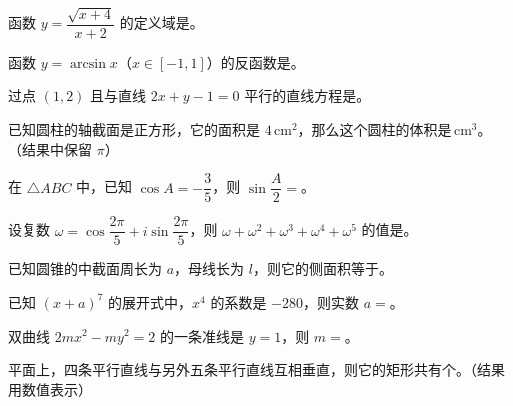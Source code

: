 \begin{question}
函数 $y=\dfrac{\sqrt{x+4}}{x+2}$ 的定义域是\gkblank{}。

\end{question}
\begin{question}
函数 $y=\arcsin x$（$x\in[-1,1]$）的反函数是\gkblank{}。

\end{question}
\begin{question}
过点 $(1,2)$ 且与直线 $2x+y-1=0$ 平行的直线方程是\gkblank{}。

\end{question}
\begin{question}
已知圆柱的轴截面是正方形，它的面积是 $4\,\mathrm{cm}^2$，那么这个圆柱的体积是\gkblank{}$\,\mathrm{cm}^3$。（结果中保留 $\pi$）

\end{question}
\begin{question}
在 $\triangle ABC$ 中，已知 $\cos A=-\dfrac35$，则 $\sin\dfrac A2=$\gkblank{}。

\end{question}
\begin{question}
设复数 $\omega=\cos\dfrac{2\pi}{5}+i\sin\dfrac{2\pi}{5}$，则 $\omega+\omega^2+\omega^3+\omega^4+\omega^5$ 的值是\gkblank{}。

\end{question}
\begin{question}
已知圆锥的中截面周长为 $a$，母线长为 $l$，则它的侧面积等于\gkblank{}。

\end{question}
\begin{question}
已知 $(x+a)^7$ 的展开式中，$x^4$ 的系数是 $-280$，则实数 $a=$\gkblank{}。

\end{question}
\begin{question}
双曲线 $2mx^2-my^2=2$ 的一条准线是 $y=1$，则 $m=$\gkblank{}。

\end{question}
\begin{question}
平面上，四条平行直线与另外五条平行直线互相垂直，则它的矩形共有\gkblank{}个。（结果用数值表示）

\end{question}

